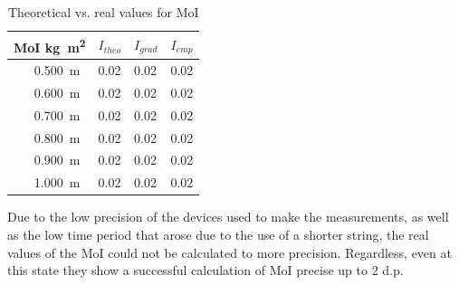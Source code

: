 \documentclass[a4paper,12pt]{article}
\theoremstyle{definition}
\begin{document}
\begin{table}[H]
\begin{center}
\begin{tabular}{l||c|l|ll} \toprule
\multicolumn{2}{l||}{MoI \si{kg.m^2}}   & $I_{theo}$  & $I_{grad}$  & $I_{emp}$\\ \midrule
\parbox[t]{2mm}{} 
								   & \SI{0.500}{m}     &  0.02 &  0.02 & 0.02\\
                                   & \SI{0.600}{m}    &  0.02 & 0.02 & 0.02\\
                                   & \SI{0.700}{m}    &    0.02 & 0.02  & 0.02\\
                                   & \SI{0.800}{m}     &   0.02 & 0.02 & 0.02\\
                                   	& \SI{0.900}{m}     &   0.02 &  0.02 & 0.02\\
                                   		& \SI{1.000}{m}     &   0.02 &  0.02 & 0.02\\
                       
\bottomrule
\end{tabular}
\end{center}
\caption{Theoretical vs. real values for MoI}
\label{tab:comparisionofintertialvalues}
\end{table}
Due to the low precision of the devices used to make the measurements, as well as the low time period that arose due to the use of a shorter string, the real values of the MoI could not be calculated to more precision. Regardless, even at this state they show a successful calculation of MoI precise up to 2 d.p.
\end{document}
